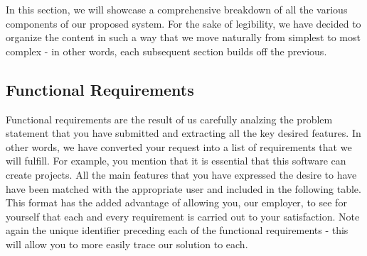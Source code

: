 \documentclass[12pt,letterpaper]{article}
\begin{document}
In this section, we will showcase a comprehensive breakdown of all the various components of our proposed system. For the sake of 
legibility, we have decided to organize the content in such a way that we move naturally from simplest to most complex - in other words,
each subsequent section builds off the previous. 

\subsection{Functional Requirements}

Functional requirements are the result of us carefully analzing the problem statement that you have submitted and extracting all the key 
desired features. In other words, we have converted your request into a list of requirements that we will fulfill. For example, you mention that
it is essential that this software can create projects. All the main features that you have expressed the desire to have have been matched with
the appropriate user and included in the following table. This format has the added advantage of allowing you, our employer, to see for 
yourself that each and every requirement is carried out to your satisfaction. Note again the unique identifier preceding each of the functional 
requirements - this will allow you to more easily trace our solution to each. 
\end{document}
